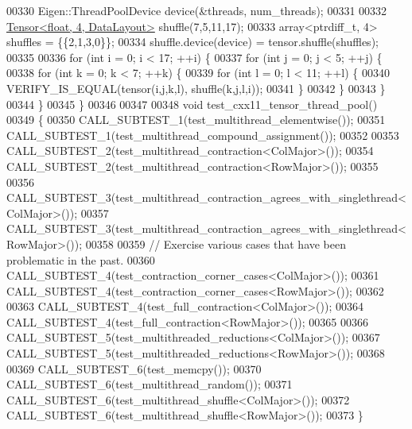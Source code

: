 \begin{DoxyCode}
00330   Eigen::ThreadPoolDevice device(&threads, num\_threads);
00331 
00332   \hyperlink{class_eigen_1_1_tensor}{Tensor<float, 4, DataLayout>} shuffle(7,5,11,17);
00333   array<ptrdiff\_t, 4> shuffles = \{\{2,1,3,0\}\};
00334   shuffle.device(device) = tensor.shuffle(shuffles);
00335 
00336   \textcolor{keywordflow}{for} (\textcolor{keywordtype}{int} i = 0; i < 17; ++i) \{
00337     \textcolor{keywordflow}{for} (\textcolor{keywordtype}{int} j = 0; j < 5; ++j) \{
00338       \textcolor{keywordflow}{for} (\textcolor{keywordtype}{int} k = 0; k < 7; ++k) \{
00339         \textcolor{keywordflow}{for} (\textcolor{keywordtype}{int} l = 0; l < 11; ++l) \{
00340           VERIFY\_IS\_EQUAL(tensor(i,j,k,l), shuffle(k,j,l,i));
00341         \}
00342       \}
00343     \}
00344   \}
00345 \}
00346 
00347 
00348 \textcolor{keywordtype}{void} test\_cxx11\_tensor\_thread\_pool()
00349 \{
00350   CALL\_SUBTEST\_1(test\_multithread\_elementwise());
00351   CALL\_SUBTEST\_1(test\_multithread\_compound\_assignment());
00352 
00353   CALL\_SUBTEST\_2(test\_multithread\_contraction<ColMajor>());
00354   CALL\_SUBTEST\_2(test\_multithread\_contraction<RowMajor>());
00355 
00356   CALL\_SUBTEST\_3(test\_multithread\_contraction\_agrees\_with\_singlethread<ColMajor>());
00357   CALL\_SUBTEST\_3(test\_multithread\_contraction\_agrees\_with\_singlethread<RowMajor>());
00358 
00359   \textcolor{comment}{// Exercise various cases that have been problematic in the past.}
00360   CALL\_SUBTEST\_4(test\_contraction\_corner\_cases<ColMajor>());
00361   CALL\_SUBTEST\_4(test\_contraction\_corner\_cases<RowMajor>());
00362 
00363   CALL\_SUBTEST\_4(test\_full\_contraction<ColMajor>());
00364   CALL\_SUBTEST\_4(test\_full\_contraction<RowMajor>());
00365 
00366   CALL\_SUBTEST\_5(test\_multithreaded\_reductions<ColMajor>());
00367   CALL\_SUBTEST\_5(test\_multithreaded\_reductions<RowMajor>());
00368 
00369   CALL\_SUBTEST\_6(test\_memcpy());
00370   CALL\_SUBTEST\_6(test\_multithread\_random());
00371   CALL\_SUBTEST\_6(test\_multithread\_shuffle<ColMajor>());
00372   CALL\_SUBTEST\_6(test\_multithread\_shuffle<RowMajor>());
00373 \}
\end{DoxyCode}
